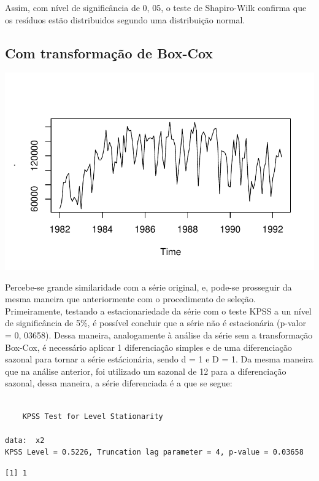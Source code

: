 \documentclass[
  letterpaper,
  DIV=11,
  numbers=noendperiod]{scrartcl}
\begin{document}
Assim, com nível de significância de 0, 05, o teste de Shapiro-Wilk
confirma que os resíduos estão distribuidos segundo uma distribuição
normal.

\hypertarget{com-transformauxe7uxe3o-de-box-cox}{%
\subsection{Com transformação de
Box-Cox}\label{com-transformauxe7uxe3o-de-box-cox}}

\includegraphics{T2_grupo10_files/figure-pdf/unnamed-chunk-3-1.pdf}

Percebe-se grande similaridade com a série original, e, pode-se
prosseguir da mesma maneira que anteriormente com o procedimento de
seleção. Primeiramente, testando a estacionariedade da série com o teste
KPSS a un nível de significância de 5\%, é possível concluir que a série
não é estacionária (p-valor = 0, 03658). Dessa maneira, analogamente à
análise da série sem a transformação Box-Cox, é necessário aplicar 1
diferenciação simples e de uma diferenciação sazonal para tornar a série
estácionária, sendo d = 1 e D = 1. Da mesma maneira que na análise
anterior, foi utilizado um sazonal de 12 para a diferenciação sazonal,
dessa maneira, a série diferenciada é a que se segue:

\begin{verbatim}

    KPSS Test for Level Stationarity

data:  x2
KPSS Level = 0.5226, Truncation lag parameter = 4, p-value = 0.03658
\end{verbatim}

\begin{verbatim}
[1] 1
\end{verbatim}
\end{document}
